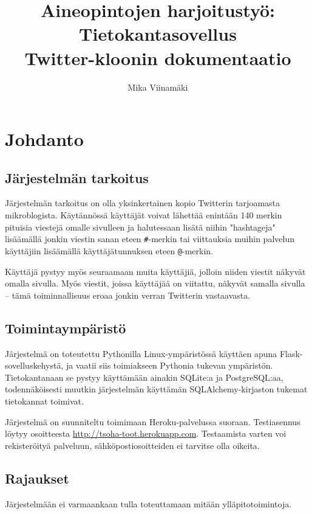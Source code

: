 \documentclass{article}
\let\stdsection\section
\renewcommand\section{\newpage\stdsection}
\begin{document}
\title{Aineopintojen harjoitustyö: Tietokantasovellus \\ Twitter-kloonin dokumentaatio}
\author{Mika Viinamäki}
\maketitle
\thispagestyle{empty}

\newpage

\tableofcontents
\newpage

\section{Johdanto}

\subsection {Järjestelmän tarkoitus}
Järjestelmän tarkoitus on olla yksinkertainen kopio Twitterin tarjoamasta mikroblogista. Käytännössä käyttäjät voivat lähettää enintään 140 merkin pituisia viestejä omalle sivulleen ja halutessaan lisätä niihin "hashtageja" lisäämällä jonkin viestin sanan eteen \verb+#+-merkin tai viittauksia muihin palvelun käyttäjiin lisäämällä käyttäjätunnuksen eteen \verb+@+-merkin.

Käyttäjä pystyy myös seuraamaan muita käyttäjiä, jolloin niiden viestit näkyvät omalla sivulla. Myös viestit, joissa käyttäjää on viitattu, näkyvät samalla sivulla -- tämä toiminnallisuus eroaa jonkin verran Twitterin vastaavasta.

\subsection{Toimintaympäristö}
Järjestelmä on toteutettu Pythonilla Linux-ympäristössä käyttäen apuna Flask-sovelluskehystä, ja vaatii siis toimiakseen Pythonia tukevan ympäristön. Tietokantanaan se pystyy käyttämään ainakin SQLite:a ja PostgreSQL:aa, todennäköisesti muutkin järjestelmän käyttämän SQLAlchemy-kirjaston tukemat tietokannat toimivat.

Järjestelmä on suunniteltu toimimaan Heroku-palvelussa suoraan. Testiasennus löytyy osoitteesta \url{http://tsoha-toot.herokuapp.com}. Testaamista varten voi rekisteröityä palveluun, sähköpostiosoitteiden ei tarvitse olla oikeita.

\subsection{Rajaukset}
Järjestelmään ei varmaankaan tulla toteuttamaan mitään ylläpitotoimintoja.
\end{document}
